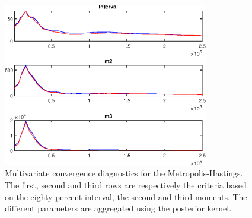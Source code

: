  
\begin{figure}[H]
\centering 
\includegraphics[width=0.8\textwidth]{BRS_aggregate/Output/BRS_aggregate_mdiag}
\caption{Multivariate convergence diagnostics for the Metropolis-Hastings.
The first, second and third rows are respectively the criteria based on
the eighty percent interval, the second and third moments. The different 
parameters are aggregated using the posterior kernel.}\label{Fig:MultivariateDiagnostics}
\end{figure}

